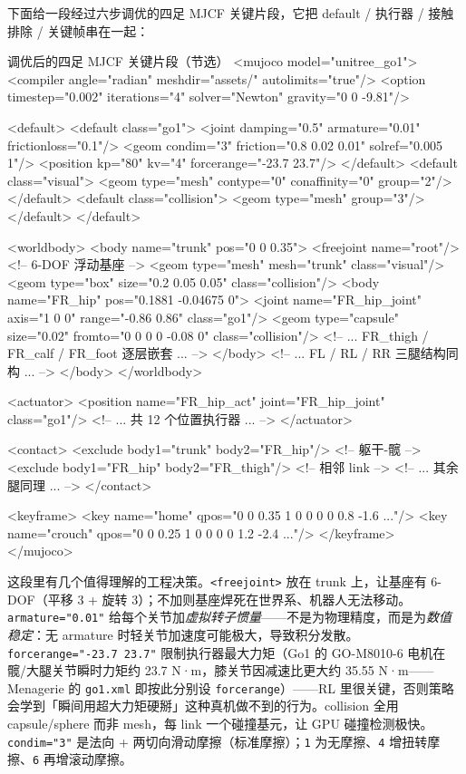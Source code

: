 下面给一段经过六步调优的四足 MJCF 关键片段，它把 default / 执行器 / 接触排除 / 关键帧串在一起：

\begin{codebox}[text]{调优后的四足 MJCF 关键片段（节选）}
<mujoco model="unitree_go1">
  <compiler angle="radian" meshdir="assets/" autolimits="true"/>
  <option timestep="0.002" iterations="4" solver="Newton" gravity="0 0 -9.81"/>

  <default>
    <default class="go1">
      <joint damping="0.5" armature="0.01" frictionloss="0.1"/>
      <geom condim="3" friction="0.8 0.02 0.01" solref="0.005 1"/>
      <position kp="80" kv="4" forcerange="-23.7 23.7"/>
    </default>
    <default class="visual">
      <geom type="mesh" contype="0" conaffinity="0" group="2"/>
    </default>
    <default class="collision">
      <geom type="mesh" group="3"/>
    </default>
  </default>

  <worldbody>
    <body name="trunk" pos="0 0 0.35">
      <freejoint name="root"/>                 <!-- 6-DOF 浮动基座 -->
      <geom type="mesh" mesh="trunk" class="visual"/>
      <geom type="box" size="0.2 0.05 0.05" class="collision"/>
      <body name="FR_hip" pos="0.1881 -0.04675 0">
        <joint name="FR_hip_joint" axis="1 0 0" range="-0.86 0.86" class="go1"/>
        <geom type="capsule" size="0.02" fromto="0 0 0 0 -0.08 0" class="collision"/>
        <!-- ... FR_thigh / FR_calf / FR_foot 逐层嵌套 ... -->
      </body>
      <!-- ... FL / RL / RR 三腿结构同构 ... -->
    </body>
  </worldbody>

  <actuator>
    <position name="FR_hip_act" joint="FR_hip_joint" class="go1"/>
    <!-- ... 共 12 个位置执行器 ... -->
  </actuator>

  <contact>
    <exclude body1="trunk" body2="FR_hip"/>     <!-- 躯干-髋 -->
    <exclude body1="FR_hip" body2="FR_thigh"/>  <!-- 相邻 link -->
    <!-- ... 其余腿同理 ... -->
  </contact>

  <keyframe>
    <key name="home"   qpos="0 0 0.35 1 0 0 0  0 0.8 -1.6 ..."/>
    <key name="crouch" qpos="0 0 0.25 1 0 0 0  0 1.2 -2.4 ..."/>
  </keyframe>
</mujoco>
\end{codebox}

这段里有几个值得理解的工程决策。\texttt{<freejoint>} 放在 trunk 上，让基座有 6-DOF（平移 3 + 旋转 3）；不加则基座焊死在世界系、机器人无法移动。\texttt{armature="0.01"} 给每个关节加\emph{虚拟转子惯量}——不是为物理精度，而是为\emph{数值稳定}：无 armature 时轻关节加速度可能极大，导致积分发散。\texttt{forcerange="-23.7 23.7"} 限制执行器最大力矩（Go1 的 GO-M8010-6 电机在髋/大腿关节瞬时力矩约 23.7 N·m，膝关节因减速比更大约 35.55 N·m——Menagerie 的 \texttt{go1.xml} 即按此分别设 \texttt{forcerange}）——RL 里很关键，否则策略会学到「瞬间用超大力矩硬掰」这种真机做不到的行为。collision 全用 capsule/sphere 而非 mesh，每 link 一个碰撞基元，让 GPU 碰撞检测极快。\texttt{condim="3"} 是法向 + 两切向滑动摩擦（标准摩擦）；\texttt{1} 为无摩擦、\texttt{4} 增扭转摩擦、\texttt{6} 再增滚动摩擦。

